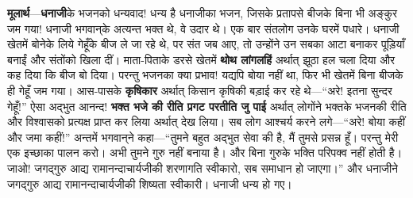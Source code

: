 \begin{sloppypar}\justifying{}
\textbf{मूलार्थ}—\textbf{धनाजी}के भजनको धन्यवाद! धन्य है धनाजीका भजन, जिसके प्रतापसे बीजके बिना भी अङ्कुर जम गया! धनाजी भगवान्‌के अत्यन्त भक्त थे, वे उदार थे। एक बार संतलोग उनके घरमें पधारे। धनाजी खेतमें बोनेके लिये गेहूँके बीज ले जा रहे थे, पर संत जब आए, तो उन्होंने उन सबका आटा बनाकर पूड़ियाँ बनाईं और संतोंको खिला दीं। माता-पिताके डरसे खेतमें \textbf{थोथ लांगलहिं} अर्थात् झूठा हल चला दिया और कह दिया कि बीज बो दिया। परन्तु भजनका क्या प्रभाव! यद्यपि बोया नहीं था, फिर भी खेतमें बिना बीजके ही गेहूँ जम गया। आस-पासके \textbf{कृषिकार} अर्थात् किसान कृषिकी बड़ाई कर रहे थे—“अरे! इतना सुन्दर गेहूँ!” ऐसा अद्भुत आनन्द! \textbf{भक्त भजे की रीति प्रगट परतीति जु पाई} अर्थात् लोगोंने भक्तके भजनकी रीति और विश्वासको प्रत्यक्ष प्राप्त कर लिया अर्थात् देख लिया। सब लोग आश्चर्य करने लगे—“अरे! बोया कहीं और जमा कहीं!” अन्तमें भगवान्‌ने कहा—“तुमने बहुत अद्भुत सेवा की है, मैं तुमसे प्रसन्न हूँ। परन्तु मेरी एक इच्छाका पालन करो। अभी तुमने गुरु नहीं बनाया है। और बिना गुरुके भक्ति परिपक्व नहीं होती है। जाओ! जगद्गुरु आद्य रामानन्दाचार्यजीकी शरणागति स्वीकारो, सब समाधान हो जाएगा।” और धनाजीने जगद्गुरु आद्य रामानन्दाचार्यजीकी शिष्यता स्वीकारी। धनाजी धन्य हो गए।
\end{sloppypar}



